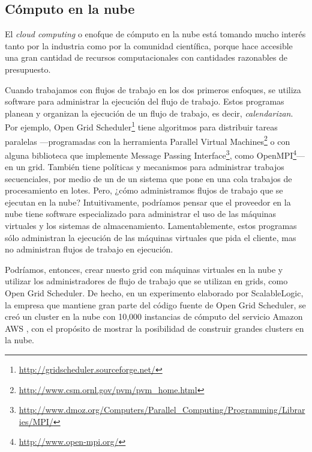 \documentclass[letterpaper]{report}
\begin{document}
\subsection*{Cómputo en la nube}

El \emph{cloud computing} o enofque de cómputo en la nube está tomando mucho interés tanto por la industria como por la comunidad científica, porque hace accesible una gran cantidad de recursos computacionales con cantidades razonables de presupuesto.

Cuando trabajamos con flujos de trabajo en los dos primeros enfoques, se utiliza software para administrar la ejecución del flujo de trabajo. Estos programas planean y organizan la ejecución de un flujo de trabajo, es decir, \emph{calendarizan}. Por ejemplo, Open Grid Scheduler\footnote{\label{fn:note1}\url{http://gridscheduler.sourceforge.net/}} tiene algoritmos para distribuir tareas paralelas —programadas con la herramienta Parallel Virtual Machines\footnote{\url{http://www.csm.ornl.gov/pvm/pvm_home.html}} o con alguna biblioteca que implemente Message Passing Interface\footnote{ \url{http://www.dmoz.org/Computers/Parallel_Computing/Programming/Libraries/MPI/} }, como OpenMPI\footnote{ \url{http://www.open-mpi.org/} }— en un grid. También tiene políticas y mecanismos para administrar trabajos secuenciales, por medio de un de un sistema que pone en una cola trabajos de procesamiento en lotes. Pero, ¿cómo administramos flujos de trabajo que se ejecutan en la nube? Intuitivamente, podríamos pensar que el proveedor en la nube tiene software especializado para administrar el uso de las máquinas virtuales y los sistemas de almacenamiento. Lamentablemente, estos programas sólo administran la ejecución de las máquinas virtuales que pida el cliente, mas no administran flujos de trabajo en ejecución. 

Podríamos, entonces, crear nuesto grid con máquinas virtuales en la nube y utilizar los administradores de flujo de trabajo que se utilizan en grids, como Open Grid Scheduler. De hecho, en un experimento elaborado por ScalableLogic, la empresa que mantiene gran parte del código fuente de Open Grid Scheduler, se creó un cluster en la nube con 10,000 instancias de cómputo del servicio Amazon AWS \cite{blog2012ogs}, con el propósito de mostrar la posibilidad de construir grandes clusters en la nube. 
\end{document}
